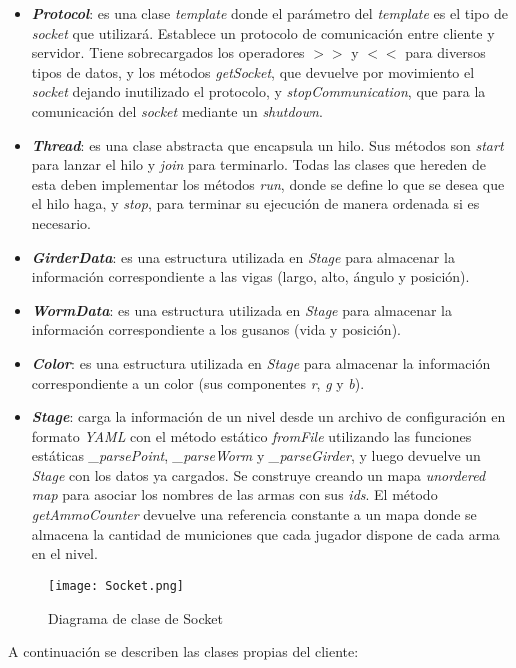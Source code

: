 \begin{itemize}
	\item \textbf{\textit{Protocol}}: es una clase \textit{template} donde el parámetro del \textit{template} es el tipo de \textit{socket} que utilizará. Establece un protocolo de comunicación entre cliente y servidor. Tiene sobrecargados los operadores $>>$ y $<<$ para diversos tipos de datos, y los métodos \textit{getSocket}, que devuelve por movimiento el \textit{socket} dejando inutilizado el protocolo, y \textit{stopCommunication}, que para la comunicación del \textit{socket} mediante un \textit{shutdown}.
	
	\item \textbf{\textit{Thread}}: es una clase abstracta que encapsula un hilo. Sus métodos son \textit{start} para lanzar el hilo y \textit{join} para terminarlo. Todas las clases que hereden de esta deben implementar los métodos \textit{run}, donde se define lo que se desea que el hilo haga, y \textit{stop}, para terminar su ejecución de manera ordenada si es necesario.
	
	\item \textbf{\textit{GirderData}}: es una estructura utilizada en \textit{Stage} para almacenar la información correspondiente a las vigas (largo, alto, ángulo y posición).
	
	\item \textbf{\textit{WormData}}: es una estructura utilizada en \textit{Stage} para almacenar la información correspondiente a los gusanos (vida y posición).
	
	\item \textbf{\textit{Color}}: es una estructura utilizada en \textit{Stage} para almacenar la información correspondiente a un color (sus componentes \textit{r}, \textit{g} y \textit{b}).
	
	\item \textbf{\textit{Stage}}: carga la información de un nivel desde un archivo de configuración en formato \textit{YAML} con el método estático \textit{fromFile} utilizando las funciones estáticas \textit{\_parsePoint}, \textit{\_parseWorm} y \textit{\_parseGirder}, y luego devuelve un \textit{Stage} con los datos ya cargados. Se construye creando un mapa \textit{unordered map} para asociar los nombres de las armas con sus \textit{ids}. El método \textit{getAmmoCounter} devuelve una referencia constante a un mapa donde se almacena la cantidad de municiones que cada jugador dispone de cada arma en el nivel.
\end{itemize}

\begin{figure}[H]
	\texttt{[image: Socket.png]}
	\caption{Diagrama de clase de Socket}
	\label{im:socket}
\end{figure}
A continuación se describen las clases propias del cliente:

